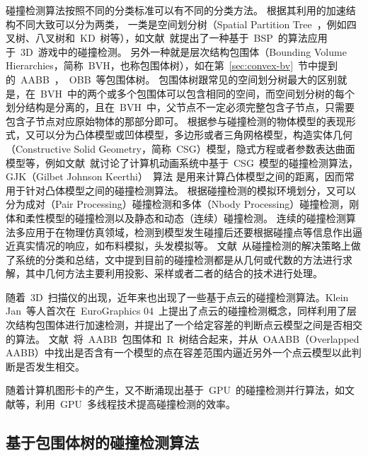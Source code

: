碰撞检测算法按照不同的分类标准可以有不同的分类方法。
根据其利用的加速结构不同大致可以分为两类，
一类是空间划分树（Spatial Partition Tree~，例如四叉树、八叉树和~KD~树等），如文献~就提出了一种基于~BSP~的算法应用于~3D~游戏中的碰撞检测。
另外一种就是层次结构包围体（Bounding Volume Hierarchies，简称~BVH，也称包围体树），如在第~\ref{sec:convex-bv}~节中提到的~AABB~，~OBB~等包围体树。
包围体树跟常见的空间划分树最大的区别就是，在~BVH~中的两个或多个包围体可以包含相同的空间，而空间划分树的每个划分结构是分离的，且在~BVH~中，父节点不一定必须完整包含子节点，只需要包含子节点对应原始物体的那部分即可\cite{ericson2005real}。 
根据参与碰撞检测的物体模型的表现形式，又可以分为凸体模型或凹体模型，多边形或者三角网格模型，构造实体几何（Constructive
Solid Geometry，简称~CSG）模型，隐式方程或者参数表达曲面模型等，例如文献~就讨论了计算机动画系统中基于~CSG~模型的碰撞检测算法，GJK（Gilbet Johnson Keerthi）~算法\cite{gilbert1988fast,bergen1999fast}
是用来计算凸体模型之间的距离，因而常用于针对凸体模型之间的碰撞检测算法。
根据碰撞检测的模拟环境划分，又可以分为成对（Pair Processing）碰撞检测和多体（Nbody Processing）碰撞检测，刚体和柔性模型的碰撞检测以及静态和动态（连续）碰撞检测\cite{lin1998collision}。
连续的碰撞检测算法多应用于在物理仿真领域，检测到模型发生碰撞后还要根据碰撞点等信息作出逼近真实情况的响应，如布料模拟\cite{Brochu2012,Wang2014}，头发模拟\cite{Kaufman2014,Chai2014}等。
文献~从碰撞检测的解决策略上做了系统的分类和总结，文中提到目前的碰撞检测都是从几何或代数的方法进行求解，其中几何方法主要利用投影、采样或者二者的结合的技术进行处理。

随着~3D~扫描仪的出现，近年来也出现了一些基于点云的碰撞检测算法。Klein Jan~等人\cite{klein2004point}首次在~EuroGraphics 04~上提出了点云的碰撞检测概念，同样利用了层次结构包围体进行加速检测，并提出了一个给定容差的判断点云模型之间是否相交的算法。
文献~将~AABB~包围体和~R~树结合起来，并从~OAABB（Overlapped AABB）中找出是否含有一个模型的点在容差范围内逼近另外一个点云模型以此判断是否发生相交。

随着计算机图形卡的产生，又不断涌现出基于~GPU~的碰撞检测并行算法，如文献等，利用~GPU~多线程技术提高碰撞检测的效率。

\subsection{基于包围体树的碰撞检测算法}
\label{sec:cd-bvh}

